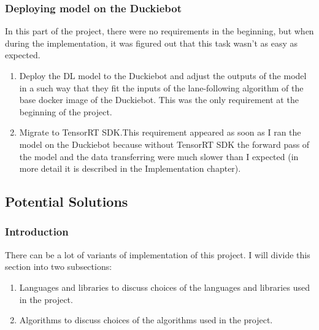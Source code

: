 \subsubsection{Deploying model on the Duckiebot}
In this part of the project, there were no requirements in the beginning, but when during the implementation, it was figured out that this task wasn't as easy as expected.
\begin{enumerate}
    \item Deploy the DL model to the Duckiebot and adjust the outputs of the model in a such way that they fit the inputs of the lane-following algorithm of the base 
    docker image of the Duckiebot. This was the only requirement at the beginning of the project.
    \item Migrate to TensorRT SDK.\@ This requirement appeared as soon as I ran the model on the Duckiebot 
    because without TensorRT SDK the forward pass of the model and the data transferring were much slower than I expected 
    (in more detail it is described in the Implementation chapter).
\end{enumerate}

\subsection{Potential Solutions}
\subsubsection{Introduction}
There can be a lot of variants of implementation of this project. I will divide this section into two subsections:
\begin{enumerate}
    \item Languages and libraries to discuss choices of the languages and libraries used in the project.
    \item Algorithms to discuss choices of the algorithms used in the project.
\end{enumerate}
